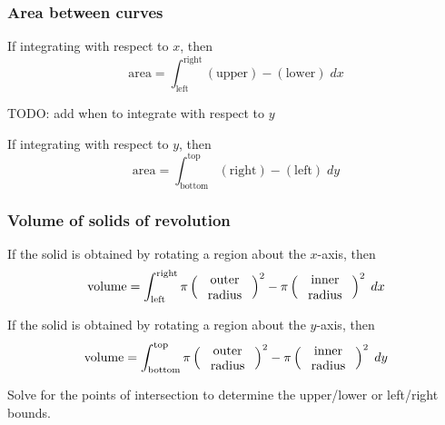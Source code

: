 \documentclass[aspectratio=169, 12pt]{beamer}
\begin{document}

\begin{frame}
  \frametitle{Area between curves}

  If integrating with respect to \(x\), then
  \[
    \text{area} = \int_{\text{left}}^{\text{right}}  (\text{upper}) - (\text{lower})  \; dx
  \]

  TODO: add when to integrate with respect to \(y\)

  If integrating with respect to \(y\), then
  \[
    \text{area} = \int_{\text{bottom}}^{\text{top}}  (\text{right}) - (\text{left})  \; dy
  \]
\end{frame}

\begin{frame}
  \frametitle{Volume of solids of revolution}

  If the solid is obtained by rotating a region about the \(x\)-axis, then
  \[
    \text{volume} = \int_{\text{left}}^{\text{right}} \pi \left( \text{\parbox{1.5cm}{\centering outer\\radius}} \right)^{2} - \pi \left( \text{\parbox{1.5cm}{\centering inner\\radius}} \right)^{2} \;dx
  \]


  \pause
  If the solid is obtained by rotating a region about the \(y\)-axis, then
  \[
    \text{volume} = \int_{\text{bottom}}^{\text{top}} \pi \left( \text{\parbox{1.5cm}{\centering outer\\radius}} \right)^{2} - \pi \left( \text{\parbox{1.5cm}{\centering inner\\radius}} \right)^{2} \;dy
  \]

  Solve for the points of intersection to determine the upper/lower or left/right bounds.
\end{frame}
\end{document}
